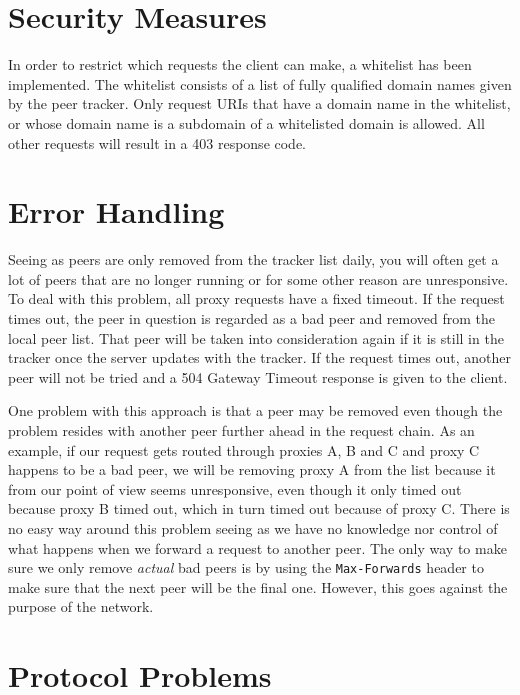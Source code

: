 \documentclass{sig-alternate}
\begin{document}
\section{Security Measures}
\label{sec:security}

In order to restrict which requests the client can make, a whitelist has been
implemented. The whitelist consists of a list of fully qualified domain names
given by the peer tracker. Only request URIs that have a domain name in the
whitelist, or whose domain name is a subdomain of a whitelisted domain is
allowed. All other requests will result in a 403 response code.


\section{Error Handling}
\label{sec:errorhandling}

Seeing as peers are only removed from the tracker list daily, you will often
get a lot of peers that are no longer running or for some other reason are
unresponsive. To deal with this problem, all proxy requests have a fixed
timeout. If the request times out, the peer in question is regarded as a
bad peer and removed from the local peer list. That peer will be taken into
consideration again if it is still in the tracker once the server updates with
the tracker. If the request times out, another peer will not be tried and a
504 Gateway Timeout response is given to the client.

One problem with this approach is that a peer may be removed even though
the problem resides with another peer further ahead in the request chain.
As an example, if our request gets routed through proxies A, B and C and
proxy C happens to be a bad peer, we will be removing proxy A from the list
because it from our point of view seems unresponsive, even though it only
timed out because proxy B timed out, which in turn timed out because of proxy
C. There is no easy way around this problem seeing as we have no knowledge
nor control of what happens when we forward a request to another peer. The
only way to make sure we only remove \emph{actual} bad peers is by using the
\verb+Max-Forwards+ header to make sure that the next peer will be the final
one. However, this goes against the purpose of the network.


\section{Protocol Problems}
\label{sec:problems}
\end{document}
